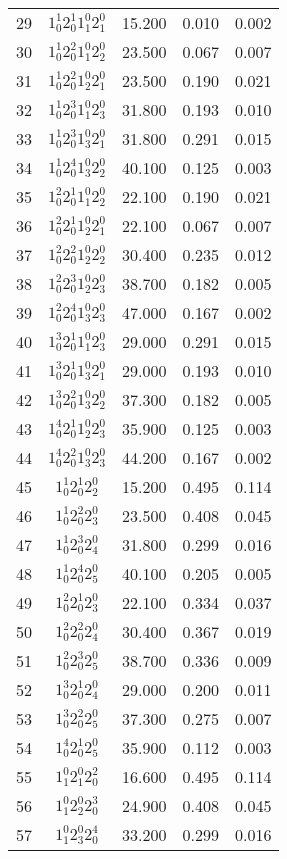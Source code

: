 \documentclass[12pt]{article}
\begin{document}
\begin{table}
\begin{tabular}{rcrrr}
29&$1_0^1 2_0^1 1_1^0 2_1^0$& 15.200& 0.010& 0.002\\
30&$1_0^1 2_0^2 1_1^0 2_2^0$& 23.500& 0.067& 0.007\\
31&$1_0^1 2_0^2 1_2^0 2_1^0$& 23.500& 0.190& 0.021\\
32&$1_0^1 2_0^3 1_1^0 2_3^0$& 31.800& 0.193& 0.010\\
33&$1_0^1 2_0^3 1_3^0 2_1^0$& 31.800& 0.291& 0.015\\
34&$1_0^1 2_0^4 1_3^0 2_2^0$& 40.100& 0.125& 0.003\\
35&$1_0^2 2_0^1 1_1^0 2_2^0$& 22.100& 0.190& 0.021\\
36&$1_0^2 2_0^1 1_2^0 2_1^0$& 22.100& 0.067& 0.007\\
37&$1_0^2 2_0^2 1_2^0 2_2^0$& 30.400& 0.235& 0.012\\
38&$1_0^2 2_0^3 1_2^0 2_3^0$& 38.700& 0.182& 0.005\\
39&$1_0^2 2_0^4 1_3^0 2_3^0$& 47.000& 0.167& 0.002\\
40&$1_0^3 2_0^1 1_1^0 2_3^0$& 29.000& 0.291& 0.015\\
41&$1_0^3 2_0^1 1_3^0 2_1^0$& 29.000& 0.193& 0.010\\
42&$1_0^3 2_0^2 1_3^0 2_2^0$& 37.300& 0.182& 0.005\\
43&$1_0^4 2_0^1 1_2^0 2_3^0$& 35.900& 0.125& 0.003\\
44&$1_0^4 2_0^2 1_3^0 2_3^0$& 44.200& 0.167& 0.002\\
45&$1_0^1 2_0^1 2_2^0$& 15.200& 0.495& 0.114\\
46&$1_0^1 2_0^2 2_3^0$& 23.500& 0.408& 0.045\\
47&$1_0^1 2_0^3 2_4^0$& 31.800& 0.299& 0.016\\
48&$1_0^1 2_0^4 2_5^0$& 40.100& 0.205& 0.005\\
49&$1_0^2 2_0^1 2_3^0$& 22.100& 0.334& 0.037\\
50&$1_0^2 2_0^2 2_4^0$& 30.400& 0.367& 0.019\\
51&$1_0^2 2_0^3 2_5^0$& 38.700& 0.336& 0.009\\
52&$1_0^3 2_0^1 2_4^0$& 29.000& 0.200& 0.011\\
53&$1_0^3 2_0^2 2_5^0$& 37.300& 0.275& 0.007\\
54&$1_0^4 2_0^1 2_5^0$& 35.900& 0.112& 0.003\\
55&$1_1^0 2_1^0 2_0^2$& 16.600& 0.495& 0.114\\
56&$1_1^0 2_2^0 2_0^3$& 24.900& 0.408& 0.045\\
57&$1_1^0 2_3^0 2_0^4$& 33.200& 0.299& 0.016\\

\end{tabular}
\end{table}
\end{document}

